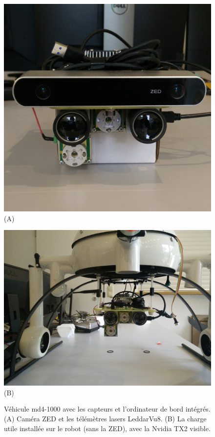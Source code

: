 \begin{figure}[htp]
  \centering
  \begin{minipage}{0.45\textwidth}
    \centering
    \includegraphics[width=\linewidth]{images/payload.jpg}
    (A)
  \end{minipage}
  \begin{minipage}{0.45\textwidth}
    \centering
    \includegraphics[width=\linewidth]{images/payload2.jpg}
    (B)
  \end{minipage}
  \caption{Véhicule md4-1000 avec les capteurs et l'ordinateur de bord intégrés. (A) Caméra ZED et les télémètres lasers LeddarVu8. (B) La charge utile installée sur le robot (sans la ZED), avec la Nvidia TX2 visible.}
  \label{fig:field_vehicle}
\end{figure}

